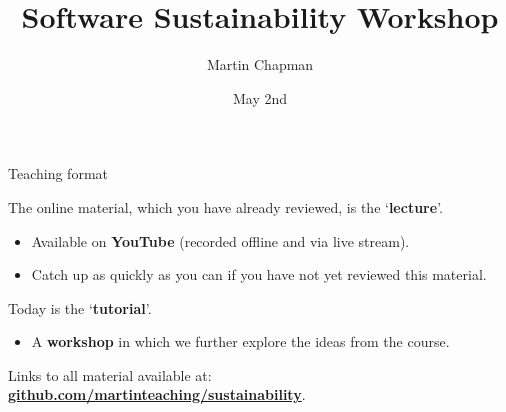 \documentclass[10pt, dvipsnames, table, aspectratio=169]{beamer}
\title{Software Sustainability Workshop}
\subtitle{}
\date{May 2nd}
\author{Martin Chapman}
\institute{King's College London}
\begin{document}



\begin{frame}[fragile]{Teaching format}

The online material, which you have already reviewed, is the `\textbf{lecture}'.

\begin{itemize}

    \item Available on \textbf{YouTube} (recorded offline and via live stream).

    \item Catch up as quickly as you can if you have not yet reviewed this material.

\end{itemize}

Today is the `\textbf{tutorial}'.

\begin{itemize}

    \item A \textbf{workshop} in which we further explore the ideas from the course.

\end{itemize}

Links to all material available at:
\href{https://github.com/martinteaching/sustainability}{\textbf{github.com/martinteaching/sustainability}}.

\end{frame}

\end{document}
